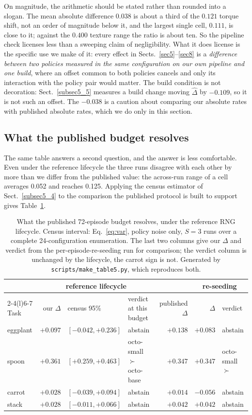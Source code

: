 \documentclass[pdflatex,iicol,sn-apa]{sn-jnl}
\theoremstyle{remark}
\begin{document}
On magnitude, the arithmetic should be stated rather than rounded into a slogan. The mean absolute
difference $0.038$ is about a third of the $0.121$ torque shift, not an order of magnitude below it,
and the largest single cell, $0.111$, is close to it; against the $0.400$ texture range the ratio is
about ten. So the pipeline check licenses less than a sweeping claim of negligibility. What it does
license is the specific use we make of it: every effect in Sects.~\ref{sec5}--\ref{sec8} is a
\emph{difference between two policies measured in the same configuration on our own pipeline and one
build}, where an offset common to both policies cancels and only its interaction with the policy pair
would matter. The build condition is not decoration: Sect.~\ref{subsec5_5} measures a build change
moving $\hat\Delta$ by $-0.109$, so it is not such an offset. The
$-0.038$ is a caution about comparing our absolute rates with published absolute rates, which we do
only in this section.

\subsection{What the published budget resolves}\label{subsec6_3}

The same table answers a second question, and the answer is less comfortable. Even under the
reference lifecycle the three runs disagree with each other by more than we differ from the published
value: the across-run range of a cell averages 0.052 and reaches 0.125. Applying the census estimator
of Sect.~\ref{subsec5_4} to the comparison the published protocol is built to support gives
Table~\ref{tab5}.

\begin{table}[t]
\caption{What the published 72-episode budget resolves, under the reference RNG lifecycle. Census
interval: Eq.~\eqref{eq:var}, policy noise only, $S = 3$ runs over a complete 24-configuration
enumeration. The last two columns give our $\Delta$ and verdict from the per-episode-re-seeding run
for comparison; the verdict column is unchanged by the lifecycle, the carrot sign is not. Generated
by \texttt{scripts/make\_table5.py}, which reproduces both.}\label{tab5}
\begin{tabular}{@{}lrllrrl@{}}
\toprule
 & \multicolumn{3}{c}{reference lifecycle} & & \multicolumn{2}{c}{re-seeding} \\
\cmidrule(lr){2-4}\cmidrule(l){6-7}
Task & our $\Delta$ & census 95\% & verdict at this budget & published $\Delta$ & $\Delta$ & verdict \\
\midrule
eggplant & $+0.097$ & $[-0.042, +0.236]$ & abstain & $+0.138$ & $+0.083$ & abstain \\
spoon & $+0.361$ & $[+0.259, +0.463]$ & octo-small $\succ$ octo-base & $+0.347$ & $+0.347$ & octo-small $\succ$ \\
carrot & $+0.028$ & $[-0.039, +0.094]$ & abstain & $+0.014$ & $\mathbf{-0.056}$ & abstain \\
stack & $+0.028$ & $[-0.011, +0.066]$ & abstain & $+0.042$ & $+0.042$ & abstain \\
\bottomrule
\end{tabular}
\end{table}
\end{document}
